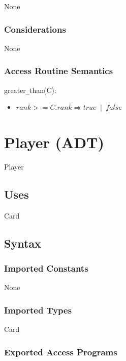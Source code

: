 \documentclass[12pt, titlepage]{article}
\begin{document}
None

\subsubsection* {Considerations}

None

\subsubsection* {Access Routine Semantics}

\noindent greater\verb|_|than(C):
\begin{itemize}
\item $rank >= C.rank \Longrightarrow true \phantom{a}|\phantom{a} false$ 

\end{itemize}

\section* {Player (ADT)}

Player

\subsection* {Uses}

Card

\subsection* {Syntax}

\subsubsection* {Imported Constants}

None

\subsubsection* {Imported Types}

Card

\subsubsection* {Exported Access Programs}
\end{document}
